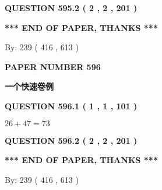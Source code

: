 \documentclass{ctexart}
\begin{document}
{\textbf{\Large{QUESTION
595.2 
 ( 2 , 2 , 201 )
}}}
  
  
   
   
 \vspace{0.2in}
 
   
   
   
   
\vspace{1.0in} 
{\textbf{\large{ *** END OF PAPER, THANKS *** }}} 
   
   
\hspace{1.0in} By: 
 239 ( 416 ,  613 )
   
   
   
   
\newpage 
\setcounter{page}{ 
   596001 } 
   
   
   
   
 {\textbf{ \Large{ PAPER NUMBER  596  }}}
   
   
\vspace{0.2in}
   
   
   
   
   
   
 \vspace{0.2in}
{\LARGE {\textbf{ 一个快速卷例}}}
   
   
  
\vspace{0.2in}
  
{\textbf{\Large{QUESTION
596.1 
 ( 1 , 1 , 101 )
}}}
  
  
 
 

$ %
26 +  %
47=   %
73$
 
 
  
\vspace{0.2in}
  
{\textbf{\Large{QUESTION
596.2 
 ( 2 , 2 , 201 )
}}}
  
  
   
   
 \vspace{0.2in}
 
   
   
   
   
\vspace{1.0in} 
{\textbf{\large{ *** END OF PAPER, THANKS *** }}} 
   
   
\hspace{1.0in} By: 
 239 ( 416 ,  613 )
   
   
   
   
\newpage 
\setcounter{page}{ 
   597001 } 
   
\end{document}
